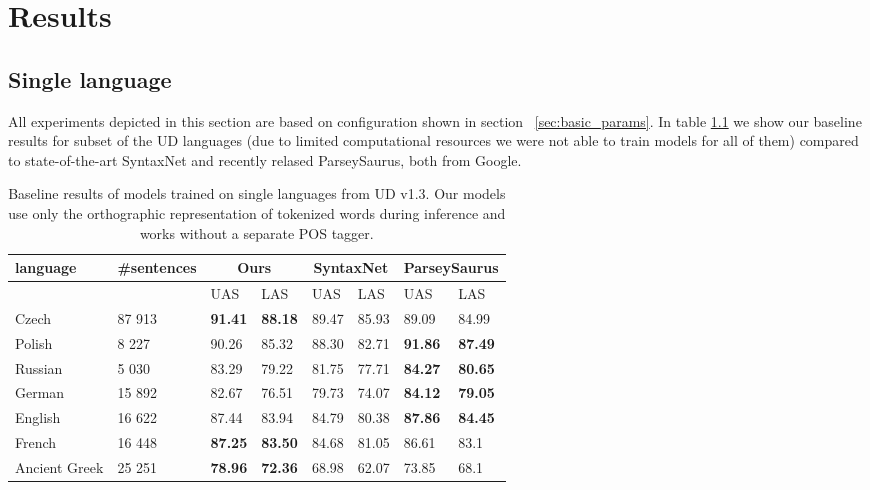 \chapter{Results}

\section{Single language}
All experiments depicted in this section are based on configuration shown in section
~\ref{sec:basic_params}. In table \ref{tab:universal} we show our baseline results
for subset of the UD languages (due to limited computational resources we were
not able to train models for all of them)
compared to state-of-the-art SyntaxNet\cite{andor_globally_2016}
and recently relased ParseySaurus\cite{alberti_parsey_saurus_2017}, both from Google.

\begin{table}[!htbp]
  \centering
  \begin{tabular}{l l | l l | l l | l l}
    language & \#sentences & \multicolumn{2}{c|}{Ours} & \multicolumn{2}{c|}{SyntaxNet} & \multicolumn{2}{c}{ParseySaurus} \\ \hline
    & & UAS & LAS & UAS & LAS & UAS & LAS\\ \hline
    Czech & 87 913 & \textbf{91.41} & \textbf{88.18} & 89.47 & 85.93 & 89.09 & 84.99 \\
    Polish & 8 227 & 90.26 & 85.32 & 88.30 & 82.71 & \textbf{91.86} & \textbf{87.49}\\
    Russian & 5 030 & 83.29 & 79.22 & 81.75 & 77.71 & \textbf{84.27} & \textbf{80.65} \\
    German & 15 892 & 82.67 & 76.51 & 79.73 & 74.07 & \textbf{84.12} & \textbf{79.05}\\
    English & 16 622 & 87.44 & 83.94 & 84.79 & 80.38 & \textbf{87.86} & \textbf{84.45}\\ %
    French & 16 448 & \textbf{87.25} & \textbf{83.50} & 84.68 & 81.05 & 86.61 & 83.1\\
    Ancient Greek & 25 251 & \textbf{78.96} & \textbf{72.36} & 68.98 & 62.07 & 73.85 & 68.1
  \end{tabular}
  \caption{Baseline results of models trained on single languages from
    UD v1.3. Our models use only the orthographic representation of
    tokenized words during inference and works without a separate POS tagger.}
  \label{tab:universal}
\end{table}

